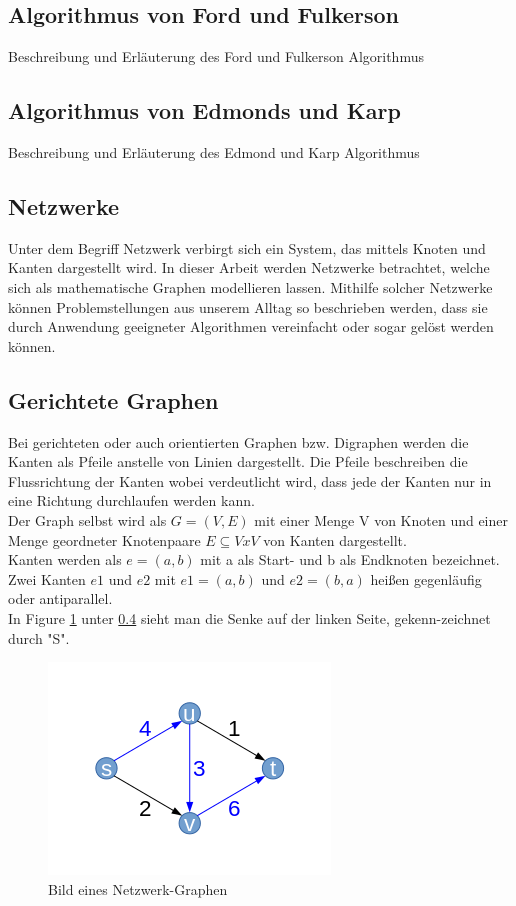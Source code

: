 \documentclass[a4paper]{llncs}
\begin{document}
\subsection{Algorithmus von Ford und Fulkerson}
Beschreibung und Erläuterung des Ford und Fulkerson Algorithmus

\subsection{Algorithmus von Edmonds und Karp}
Beschreibung und Erläuterung des Edmond und Karp Algorithmus

\subsection{Netzwerke}
\label{Netzwerke}
Unter dem Begriff Netzwerk verbirgt sich ein System, das mittels Knoten und Kanten dargestellt wird.  In dieser Arbeit werden Netzwerke betrachtet, welche sich als mathematische Graphen modellieren lassen. Mithilfe solcher Netzwerke können Problemstellungen aus unserem Alltag so beschrieben werden, dass sie durch Anwendung geeigneter Algorithmen vereinfacht oder sogar gelöst werden können.


\subsection{Gerichtete Graphen}
\label{Graph}
Bei gerichteten oder auch orientierten Graphen bzw. Digraphen werden die Kanten als Pfeile anstelle von Linien dargestellt. Die Pfeile beschreiben die Flussrichtung der Kanten wobei verdeutlicht wird, dass jede der Kanten nur in eine Richtung durchlaufen werden kann.\\

Der Graph selbst wird als
$G = (V,E)$ mit einer Menge V von Knoten und einer Menge
geordneter Knotenpaare $E \subseteq V x V$ von Kanten dargestellt.\\

Kanten werden als 
$e = (a,b)$
mit a als Start- und b als Endknoten bezeichnet.
Zwei Kanten $e1$ und $e2$ mit 
$e1 = (a,b)$ und $e2 = (b,a)$
heißen gegenläufig oder antiparallel.\\

In Figure \ref{fig:Graph1} unter \ref{Graph} sieht man die Senke auf der linken Seite, gekenn-zeichnet durch "S". 

\begin{figure}[htbp] 
  \centering
     \includegraphics{graph1} 
  \caption{Bild eines Netzwerk-Graphen}
  \label{fig:Graph1}
\end{figure}
\end{document}

